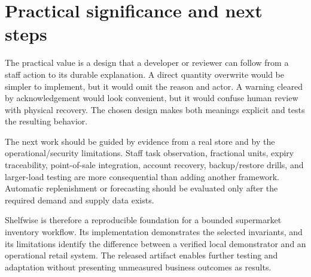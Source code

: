 \section{Practical significance and next steps}
The practical value is a design that a developer or reviewer can follow from a staff action to its durable explanation. A direct quantity overwrite would be simpler to implement, but it would omit the reason and actor. A warning cleared by acknowledgement would look convenient, but it would confuse human review with physical recovery. The chosen design makes both meanings explicit and tests the resulting behavior.

The next work should be guided by evidence from a real store and by the operational/security limitations. Staff task observation, fractional units, expiry traceability, point-of-sale integration, account recovery, backup/restore drills, and larger-load testing are more consequential than adding another framework. Automatic replenishment or forecasting should be evaluated only after the required demand and supply data exists.

Shelfwise is therefore a reproducible foundation for a bounded supermarket inventory workflow. Its implementation demonstrates the selected invariants, and its limitations identify the difference between a verified local demonstrator and an operational retail system. The released artifact enables further testing and adaptation without presenting unmeasured business outcomes as results.
